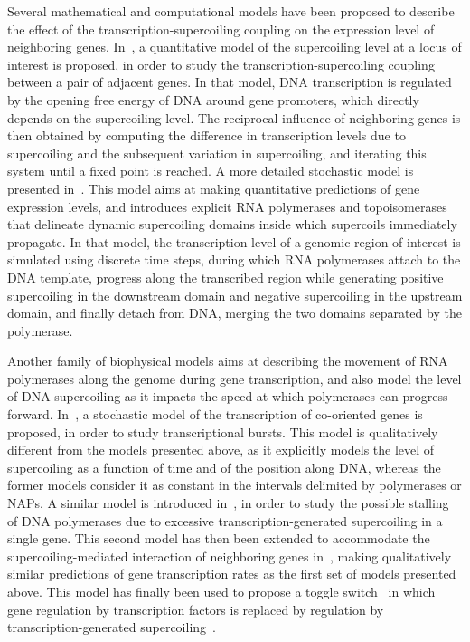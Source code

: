 Several mathematical and computational models have been proposed to describe the effect of the transcription-supercoiling coupling on the expression level of neighboring genes.
In~\cite{meyer2014}, a quantitative model of the supercoiling level at a locus of interest is proposed, in order to study the transcription-supercoiling coupling between a pair of adjacent genes.
In that model, DNA transcription is regulated by the opening free energy of DNA around gene promoters, which directly depends on the supercoiling level.
The reciprocal influence of neighboring genes is then obtained by computing the difference in transcription levels due to supercoiling and the subsequent variation in supercoiling, and iterating this system until a fixed point is reached.
A more detailed stochastic model is presented in~\cite{elhoudaigui2019}.
This model aims at making quantitative predictions of gene expression levels, and introduces explicit RNA polymerases and topoisomerases that delineate dynamic supercoiling domains inside which supercoils immediately propagate.
In that model, the transcription level of a genomic region of interest is simulated using discrete time steps, during which RNA polymerases attach to the DNA template, progress along the transcribed region while generating positive supercoiling in the downstream domain and negative supercoiling in the upstream domain, and finally detach from DNA, merging the two domains separated by the polymerase.

Another family of biophysical models aims at describing the movement of RNA polymerases along the genome during gene transcription, and also model the level of DNA supercoiling as it impacts the speed at which polymerases can progress forward.
In~\cite{brackley2016}, a stochastic model of the transcription of co-oriented genes is proposed, in order to study transcriptional bursts.
This model is qualitatively different from the models presented above, as it explicitly models the level of supercoiling as a function of time and of the position along DNA, whereas the former models consider it as constant in the intervals delimited by polymerases or NAPs.
A similar model is introduced in~\cite{sevier2017}, in order to study the possible stalling of DNA polymerases due to excessive transcription-generated supercoiling in a single gene.
This second model has then been extended to accommodate the supercoiling-mediated interaction of neighboring genes in~\cite{sevier2018}, making qualitatively similar predictions of gene transcription rates as the first set of models presented above.
This model has finally been used to propose a toggle switch~\citep{gardner2000} in which gene regulation by transcription factors is replaced by regulation by transcription-generated supercoiling~\citep{sevier2021}.

